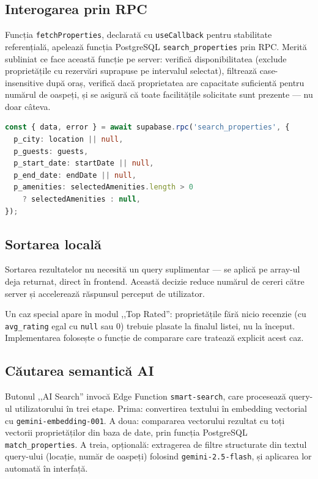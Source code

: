 \documentclass[12pt,a4paper,oneside]{report}
\begin{document}
\subsection{Interogarea prin RPC}

Funcția \texttt{fetchProperties}, declarată cu \texttt{useCallback} pentru stabilitate referențială, apelează funcția PostgreSQL \texttt{search\_properties} prin RPC. Merită subliniat ce face această funcție pe server: verifică disponibilitatea (exclude proprietățile cu rezervări suprapuse pe intervalul selectat), filtrează case-insensitive după oraș, verifică dacă proprietatea are capacitate suficientă pentru numărul de oaspeți, și se asigură că toate facilitățile solicitate sunt prezente — nu doar câteva.

\begin{lstlisting}[language=TypeScript, caption={Apelul RPC din ExplorePage}]
const { data, error } = await supabase.rpc('search_properties', {
  p_city: location || null,
  p_guests: guests,
  p_start_date: startDate || null,
  p_end_date: endDate || null,
  p_amenities: selectedAmenities.length > 0
    ? selectedAmenities : null,
});
\end{lstlisting}

\subsection{Sortarea locală}

Sortarea rezultatelor nu necesită un query suplimentar — se aplică pe array-ul deja returnat, direct în frontend. Această decizie reduce numărul de cereri către server și accelerează răspunsul perceput de utilizator.

Un caz special apare în modul ,,Top Rated'': proprietățile fără nicio recenzie (cu \texttt{avg\_rating} egal cu \texttt{null} sau 0) trebuie plasate la finalul listei, nu la început. Implementarea folosește o funcție de comparare care tratează explicit acest caz.

\subsection{Căutarea semantică AI}

Butonul ,,AI Search'' invocă Edge Function \texttt{smart-search}, care procesează query-ul utilizatorului în trei etape. Prima: convertirea textului în embedding vectorial cu \texttt{gemini-embedding-001}. A doua: compararea vectorului rezultat cu toți vectorii proprietăților din baza de date, prin funcția PostgreSQL \texttt{match\_properties}. A treia, opțională: extragerea de filtre structurate din textul query-ului (locație, număr de oaspeți) folosind \texttt{gemini-2.5-flash}, și aplicarea lor automată în interfață.
\end{document}
